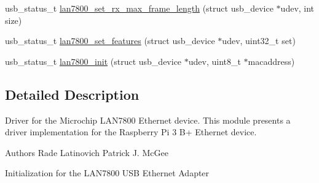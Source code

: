 \begin{DoxyCompactItemize}
\item 
usb\-\_\-status\-\_\-t \hyperlink{group__lan7800_ga659c3aa68aab22ca75556617c216f5bd}{lan7800\-\_\-set\-\_\-rx\-\_\-max\-\_\-frame\-\_\-length} (struct usb\-\_\-device $\ast$udev, int size)
\item 
usb\-\_\-status\-\_\-t \hyperlink{group__lan7800_gac6d5ce65cf6384620c04e13e67690259}{lan7800\-\_\-set\-\_\-features} (struct usb\-\_\-device $\ast$udev, uint32\-\_\-t set)
\item 
usb\-\_\-status\-\_\-t \hyperlink{group__lan7800_ga57b4e0f7b1ef285aa099af22280d4f07}{lan7800\-\_\-init} (struct usb\-\_\-device $\ast$udev, uint8\-\_\-t $\ast$macaddress)
\end{DoxyCompactItemize}


\subsection{Detailed Description}
Driver for the Microchip L\-A\-N7800 Ethernet device. This module presents a driver implementation for the Raspberry Pi 3 B+ Ethernet device.

\begin{DoxyAuthor}{Authors}
Rade Latinovich Patrick J. Mc\-Gee
\end{DoxyAuthor}
Initialization for the L\-A\-N7800 U\-S\-B Ethernet Adapter 

